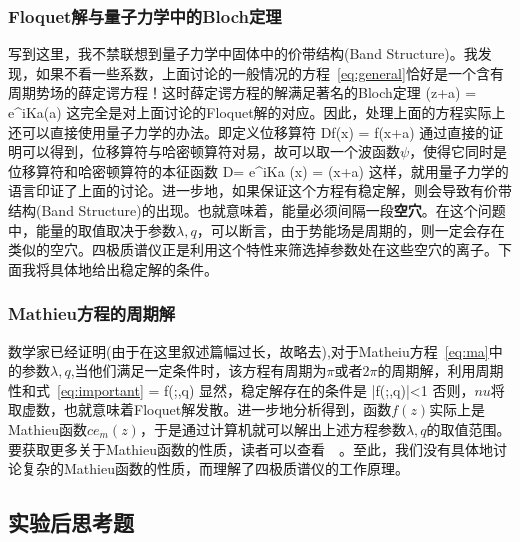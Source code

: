 \documentclass{article}
\begin{document}
\subsubsection{Floquet解与量子力学中的Bloch定理}
\par 写到这里，我不禁联想到量子力学中固体中的价带结构(Band Structure)。我发现，如果不看一些系数，上面讨论的一般情况的方程~\ref{eq:general}恰好是一个含有周期势场的薛定谔方程！这时薛定谔方程的解满足著名的Bloch定理
\beq
\psi(z+a) = e^{iKa}\psi(a)
\eeq
这完全是对上面讨论的Floquet解的对应。因此，处理上面的方程实际上还可以直接使用量子力学的办法。即定义位移算符
\beq
Df(x) = f(x+a)
\eeq
通过直接的证明可以得到，位移算符与哈密顿算符对易，故可以取一个波函数$\psi$，使得它同时是位移算符和哈密顿算符的本征函数
\beq
D\psi = e^{iKa} \psi(x) = \psi(x+a)
\eeq
这样，就用量子力学的语言印证了上面的讨论。进一步地，如果保证这个方程有稳定解，则会导致有价带结构(Band Structure)的出现。也就意味着，能量必须间隔一段\textbf{空穴}。在这个问题中，能量的取值取决于参数$\lambda,q$，可以断言，由于势能场是周期的，则一定会存在类似的空穴。四极质谱仪正是利用这个特性来筛选掉参数处在这些空穴的离子。下面我将具体地给出稳定解的条件。

\subsubsection{Mathieu方程的周期解}
\par 数学家已经证明(由于在这里叙述篇幅过长，故略去),对于Matheiu方程~\ref{eq:ma}中的参数$\lambda,q$,当他们满足一定条件时，该方程有周期为$\pi$或者$2\pi$的周期解，利用周期性和式~\ref{eq:important}
\beq
\cos\nu \pi = f(\pi;\lambda,q)
\eeq
显然，稳定解存在的条件是
\beq
|f(\pi;\lambda,q)|<1
\eeq
否则，$nu$将取虚数，也就意味着Floquet解发散。进一步地分析得到，函数$f(z)$实际上是Mathieu函数$ce_m(z)$，于是通过计算机就可以解出上述方程参数$\lambda,q$的取值范围。要获取更多关于Mathieu函数的性质，读者可以查看~\cite{ma_func}~\cite{special_func}。至此，我们没有具体地讨论复杂的Mathieu函数的性质，而理解了四极质谱仪的工作原理。




\subsection{实验后思考题}


\end{document}
